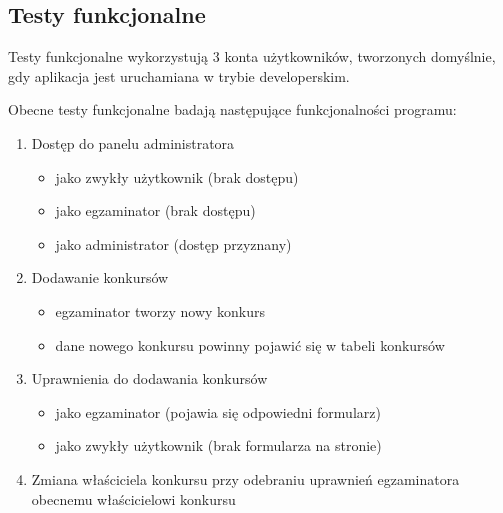 \documentclass{article}
\begin{document}
\subsection{Testy funkcjonalne}
Testy funkcjonalne wykorzystują 3 konta użytkowników, tworzonych domyślnie, gdy aplikacja jest uruchamiana w trybie developerskim.

Obecne testy funkcjonalne badają następujące funkcjonalności programu:
\begin{enumerate}
    \item Dostęp do panelu administratora
    \begin{itemize}
        \item jako zwykły użytkownik (brak dostępu)
        \item jako egzaminator (brak dostępu)
        \item jako administrator (dostęp przyznany)
    \end{itemize}
    \item Dodawanie konkursów
    \begin{itemize}
        \item egzaminator tworzy nowy konkurs
        \item dane nowego konkursu powinny pojawić się w tabeli konkursów
    \end{itemize}
    \item Uprawnienia do dodawania konkursów
    \begin{itemize}
        \item jako egzaminator (pojawia się odpowiedni formularz)
        \item jako zwykły użytkownik (brak formularza na stronie)
    \end{itemize}
    \item Zmiana właściciela konkursu przy odebraniu uprawnień egzaminatora obecnemu właścicielowi konkursu
\end{enumerate}
\end{document}

